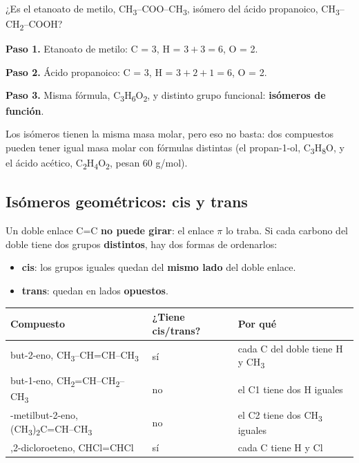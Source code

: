 \begin{ejemplo} ¿Es el etanoato de metilo, CH\textsubscript{3}--COO--CH\textsubscript{3}, isómero del ácido propanoico, CH\textsubscript{3}--CH\textsubscript{2}--COOH?\par \textbf{Paso 1.} Etanoato de metilo: C = 3, H = $3 + 3 = 6$, O = 2.\par \textbf{Paso 2.} Ácido propanoico: C = 3, H = $3 + 2 + 1 = 6$, O = 2.\par \textbf{Paso 3.} Misma fórmula, C\textsubscript{3}H\textsubscript{6}O\textsubscript{2}, y distinto grupo funcional: \textbf{isómeros de función}.\end{ejemplo}
 
\begin{ojo}[{Ojo}] Los isómeros tienen la misma masa molar, pero eso no basta: dos compuestos pueden tener igual masa molar con fórmulas distintas (el propan-1-ol, C\textsubscript{3}H\textsubscript{8}O, y el ácido acético, C\textsubscript{2}H\textsubscript{4}O\textsubscript{2}, pesan 60 g/mol).\end{ojo}
\subsection{Isómeros geométricos: cis y trans}
Un doble enlace C=C \textbf{no puede girar}: el enlace $\pi$ lo traba. Si cada carbono del doble tiene dos grupos \textbf{distintos}, hay dos formas de ordenarlos:

 
\begin{itemize}
  \item \textbf{cis}: los grupos iguales quedan del \textbf{mismo lado} del doble enlace.
  \item \textbf{trans}: quedan en lados \textbf{opuestos}.
\end{itemize}
 
\begin{center}\small
\begin{tabularx}{\linewidth}{@{}>{\raggedright\arraybackslash\hsize=1.22\hsize}X>{\raggedright\arraybackslash\hsize=0.65\hsize}X>{\raggedright\arraybackslash\hsize=1.14\hsize}X@{}}
\toprule
\textbf{Compuesto} & \textbf{¿Tiene cis/trans?} & \textbf{Por qué} \\
\midrule
but-2-eno, CH\textsubscript{3}--CH=CH--CH\textsubscript{3} & sí & cada C del doble tiene H y CH\textsubscript{3} \\
but-1-eno, CH\textsubscript{2}=CH--CH\textsubscript{2}--CH\textsubscript{3} & no & el C1 tiene dos H iguales \\
2-metilbut-2-eno, (CH\textsubscript{3})\textsubscript{2}C=CH--CH\textsubscript{3} & no & el C2 tiene dos CH\textsubscript{3} iguales \\
1,2-dicloroeteno, CHCl=CHCl & sí & cada C tiene H y Cl \\
\bottomrule
\end{tabularx}
\end{center}
  
